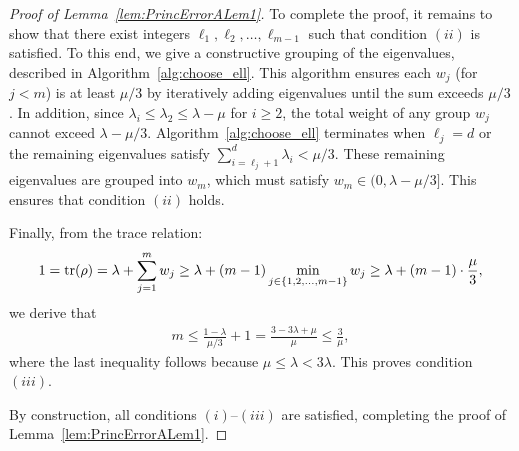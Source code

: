 \documentclass[aps,prl,twocolumn,nofootinbib,superscriptaddress,10pt]{revtex4-2}
\let\originalleft\left
\let\originalright\right
\renewcommand{\left}{\mathopen{}\mathclose\bgroup\originalleft}
\renewcommand{\right}{\aftergroup\egroup\originalright}
\newcommand{\tr}[1]{\mathrm{tr}\left( #1 \right)}
\theoremstyle{plain}
\theoremstyle{definition}
\newcommand{\lref}[1]{Lemma~\ref{#1}}
\begin{document}
\begin{proof}[Proof of \lref{lem:PrincErrorALem1}]
    To complete the proof, it remains to show that there exist integers $\ell_1, \ell_2,\dots,\ell_{m-1}$ such that condition \((ii)\) is satisfied. 
    To this end, we give a constructive grouping of the eigenvalues, described in Algorithm~\ref{alg:choose_ell}.  
	This algorithm ensures each \(w_j\) (for \(j < m\)) is at least \(\mu/3\) by iteratively adding eigenvalues until the sum exceeds \(\mu/3\). 
	In addition, since  \(\lambda_i \leq \lambda_2 \leq \lambda - \mu\) for \(i \geq 2\), the total weight of any group \(w_j\) cannot exceed \(\lambda - \mu/3\). %
	Algorithm~\ref{alg:choose_ell} terminates when $\ell_j=d$ or the remaining eigenvalues satisfy
	$\sum_{i=\ell_{j}+1}^{d} \lambda_i <\mu/3$. 
	These remaining eigenvalues are grouped into \(w_m\), which must satisfy \(w_m \in (0, \lambda - \mu/3]\). This ensures that condition \((ii)\) holds.
	
	Finally, %
	from the trace relation:
	\begin{align}
		1= \tr\rho=\lambda+ \sum_{j=1}^m w_j \geq \lambda+ (m-1) \min_{j\in\{1,2,\dots,m-1\}}w_j
		\geq \lambda + (m-1) \cdot \frac{\mu}{3}, 
	\end{align}
	we derive that 
	\begin{align}
		m \leq \frac{1 - \lambda}{\mu/3} + 1 
		=\frac{3 - 3\lambda+\mu}{\mu} 
		\leq \frac{3}{\mu}, 
	\end{align}
	where the last inequality follows because $\mu\leq \lambda<3\lambda$. This proves condition \((iii)\).
	
	By construction, all conditions \((i)\)–\((iii)\) are satisfied, completing the proof of \lref{lem:PrincErrorALem1}.
\end{proof}
\end{document}
